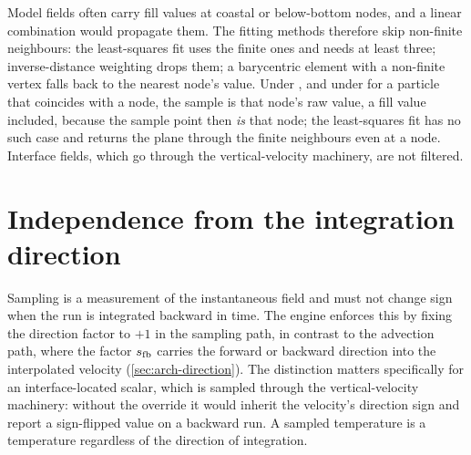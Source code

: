 Model fields often carry fill values at coastal or below-bottom nodes, and a linear combination would
propagate them. The fitting methods therefore skip non-finite neighbours: the least-squares fit uses
the finite ones and needs at least three; inverse-distance weighting drops them; a barycentric element
with a non-finite vertex falls back to the nearest node's value. Under , and under
 for a particle that coincides with a node, the sample is that node's raw value, a fill value
included, because the sample point then \emph{is} that node; the least-squares fit has no such case and
returns the plane through the finite neighbours even at a node. Interface fields, which go through the vertical-velocity
machinery, are not filtered.

\section{Independence from the integration direction}\label{sec:samp-direction}

Sampling is a measurement of the instantaneous field and must not change sign when the
run is integrated backward in time. The engine enforces this by fixing the
direction factor to $+1$ in the sampling path, in contrast to the advection path, where
the factor $s_{\mathrm{fb}}$ carries the forward or backward direction into the interpolated
velocity (\cref{sec:arch-direction}). The distinction matters specifically for an
interface-located scalar, which is sampled through the vertical-velocity machinery:
without the override it would inherit the velocity's direction sign and report a
sign-flipped value on a backward run. A sampled temperature is a temperature regardless
of the direction of integration.

